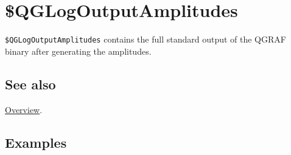 \documentclass[../FeynHelpersManual.tex]{subfiles}
\begin{document}
\hypertarget{dollarqglogoutputamplitudes}{
\section{\$QGLogOutputAmplitudes}\label{dollarqglogoutputamplitudes}}

\texttt{\$QGLogOutputAmplitudes} contains the full standard output of
the QGRAF binary after generating the amplitudes.

\subsection{See also}

\hyperlink{toc}{Overview}.

\subsection{Examples}
\end{document}
